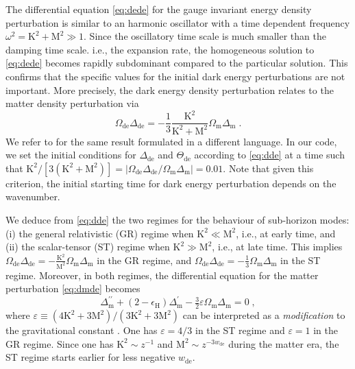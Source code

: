\documentclass[nofootinbib,a4paper,aps,prd,10pt,superscriptaddress,reprint,showkeys,showpacs]{revtex4-1}
\newcommand{\qsubrm}[2]{{#1}_{\scriptscriptstyle{\textrm{#2}}}}
\def\be{\begin{equation}}
\def\ee{\end{equation}}
\begin{document}
The differential equation \eqref{eq:dede} for the gauge invariant energy density perturbation is similar to an harmonic 
oscillator with a time dependent frequency $\omega^2=\mathrm{K}^2+\mathrm{M}^2\gg 1$. Since the oscillatory time scale 
is much smaller than the damping time scale. i.e., the expansion rate, the homogeneous solution to \eqref{eq:dede} 
becomes rapidly subdominant compared to the particular solution. This confirms that the specific values for the initial 
dark energy perturbations are not important. More precisely, the dark energy density perturbation relates to the matter 
density perturbation via
\be\label{eq:dde}
 \qsubrm{\Omega}{de}\qsubrm{\Delta}{de} = 
 -\frac{1}{3}\frac{\mathrm{K}^2}{\mathrm{K}^2+\mathrm{M}^2}\qsubrm{\Omega}{m}\qsubrm{\Delta}{m}\;.
\ee
We refer to \citep{Tsujikawa2009} for the same result formulated in a different language. In our code, we set the 
initial conditions for $\qsubrm{\Delta}{de}$ and $\qsubrm{\Theta}{de}$ according to \eqref{eq:dde} at a time such that 
$\mathrm{K}^2/[3(\mathrm{K}^2+\mathrm{M}^2)]=
|\qsubrm{\Omega}{de}\qsubrm{\Delta}{de}/\qsubrm{\Omega}{m}\qsubrm{\Delta}{m}|=0.01$. 
Note that given this criterion, the initial starting time for dark energy perturbation depends on the wavenumber.

We deduce from \eqref{eq:dde} the two regimes for the behaviour of sub-horizon modes: (i) the general relativistic (GR) 
regime when $\mathrm{K}^2\ll\mathrm{M}^2$, i.e., at early time, and (ii) the scalar-tensor (ST) regime when 
$\mathrm{K}^2\gg\mathrm{M}^2$, i.e., at late time. This implies $\qsubrm{\Omega}{de}\qsubrm{\Delta}{de} = 
-\frac{\mathrm{K}^2}{\mathrm{M}^2}\qsubrm{\Omega}{m}\qsubrm{\Delta}{m}$ in the GR regime, and 
$\qsubrm{\Omega}{de}\qsubrm{\Delta}{de} = -\frac{1}{3}\qsubrm{\Omega}{m}\qsubrm{\Delta}{m}$ in the ST regime. 
Moreover, in both regimes, the differential equation for the matter perturbation \eqref{eq:dmde} becomes
\be\label{eqn:gfe}
 \qsubrm{\Delta}{m}^{\prime\prime} + (2-\qsubrm{\epsilon}{H})\qsubrm{\Delta}{m}^\prime - 
 \tfrac{3}{2}\varepsilon\qsubrm{\Omega}{m}\qsubrm{\Delta}{m} = 0\;,
\ee
where $\varepsilon\equiv (4\mathrm{K}^2+3\mathrm{M}^2)/(3\mathrm{K}^2+3\mathrm{M}^2)$ can be interpreted as a 
\textit{modification} to the gravitational constant \citep{Starobinsky2007}. One has $\varepsilon=4/3$ in the ST regime 
and $\varepsilon=1$ in the GR regime. Since one has $\mathrm{K}^2\sim z^{-1}$ and 
$\mathrm{M}^2\sim z^{-3\qsubrm{w}{de}}$ during the matter era, the ST regime starts earlier for less negative 
$\qsubrm{w}{de}$.
\end{document}

